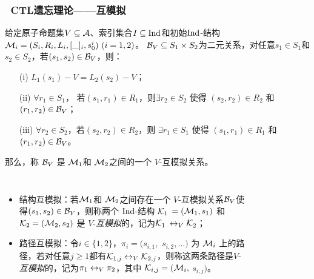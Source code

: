 \documentclass[9pt, CJK]{beamer}
\begin{document}
	\begin{frame} 
		\frametitle{~CTL遗忘理论——{\footnotesize 互模拟}}
		{\scriptsize 
			\begin{definition}[$V$-互模拟]
				\label{def:VInd:bisimulation}
				给定原子命题集$V\subseteq\cal A$、索引集合$I\subseteq \textrm{Ind}$和初始$\textrm{Ind}$-结构 ${\cal M}_i=(S_i, R_i,L_i, [\_]_i, s_0^i)~(i=1,2)$。
				${\cal B}_V \subseteq S_1 \times S_2$为二元关系，对任意$s_1 \in S_1$和$s_2 \in S_2$，若$(s_1, s_2)\in {\cal B}_V$，则：
				\begin{itemize}[<+-| alert@+>]
					\item[(i)] $L_1(s_1) - V = L_2(s_2) -V$；
					\item[(ii)] $\forall r_1\in S_1$， 若$(s_1, r_1)\in R_1$，则$\exists r_2 \in S_2$ 使得 $(s_2,r_2) \in R_2$ 和 $(r_1, r_2) \in {\cal B}_V$；
					\item[(iii)] $\forall r_2\in S_2$，若$(s_2, r_2)\in R_2$，则 $\exists r_1 \in S_1$ 使得 $(s_1,r_1) \in R_1$ 和 $(r_1, r_2)\in {\cal B}_V$。
				\end{itemize}
				那么，称 ${\cal B}_V$ 是 ${\cal M}_1$和 ${\cal M}_2$之间的一个 $V$-互模拟关系。
			\end{definition}
			\begin{columns}
				\begin{itemize}
					\item \textcolor{blue!80}{结构互模拟}：若${\cal M}_1$和 ${\cal M}_2$之间存在一个 $V$-互模拟关系${\cal B}_V$使得$(s_1, s_2)\in {\cal B}_V$，则称两个 $\textrm{Ind}$-结构 ${\cal K}_1$ $= ({\cal M}_1, s_1)$ 和 ${\cal K}_2 = ({\cal M}_2, s_2)$ 是 $V$-{\em 互模拟}的，记为${\cal K}_1$ $\leftrightarrow_V {\cal K}_2$；
					\item \textcolor{blue!80}{路径互模拟}：令$i\in \{1,2\}$，$\pi_i=(s_{i,1},$ $s_{i,2},\ldots)$ 为 ${\cal M}_i$ 上的路径，若对任意$j \ge 1$都有$ {\cal K}_{1,j} \leftrightarrow_V {\cal K}_{2,j}$，则称这两条路径是$V$-{\em 互模拟}的，记为$\pi_1 \leftrightarrow_V \pi_2$，其中 ${\cal K}_{i,j}=({\cal M}_i,$ $s_{i,j})$。
				\end{itemize}
				\begin{figure}
					\centering
\end{figure}
\end{columns}}
\end{frame}
\end{document}
